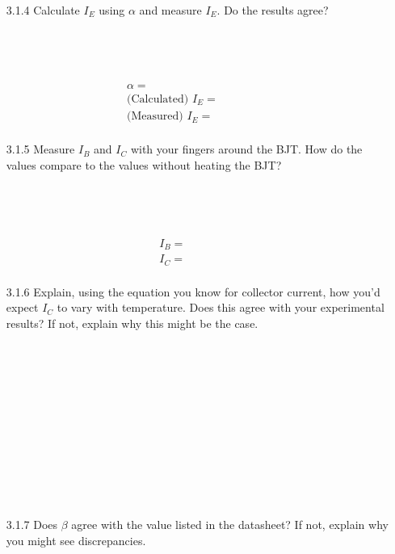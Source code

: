 \documentclass{article}
\begin{document}
\begin{enumerate}
\item[3.1.4] Calculate $I_E$ using $\alpha$ and measure $I_E$. Do the results agree?
  \\~\\~\\~\\~\\
  \begin{align*}
    \boxed{\alpha = ~~~~~~~~~~~~~~~~~~~~~~ } \\
    \text{(Calculated) } \boxed{I_{E} = ~~~~~~~~~~~~~~~~~~~~~~ } \\
    \text{(Measured) } \boxed{I_{E} = ~~~~~~~~~~~~~~~~~~~~~~ } \\
  \end{align*} 
  
\item[3.1.5] Measure $I_B$ and $I_C$ with your fingers around the BJT. How do the values compare to the values without heating the BJT?
  \\~\\~\\~\\~\\
  \begin{align*}
    \boxed{I_{B} = ~~~~~~~~~~~~~~~~~~~~~~ } \\
    \boxed{I_{C} = ~~~~~~~~~~~~~~~~~~~~~~ } \\
  \end{align*}

\item[3.1.6] Explain, using the equation you know for collector current, how you'd expect $I_C$ to vary with temperature. Does this agree with your experimental results? If not, explain why this might be the case. 
  \\~\\~\\~\\~\\~\\~\\~\\~\\~\\~\\~\\
  
\item[3.1.7] Does $\beta$ agree with the value listed in the datasheet? If not, explain why you might see discrepancies.
  \\~\\~\\~\\~\\


\end{enumerate}
\end{document}
